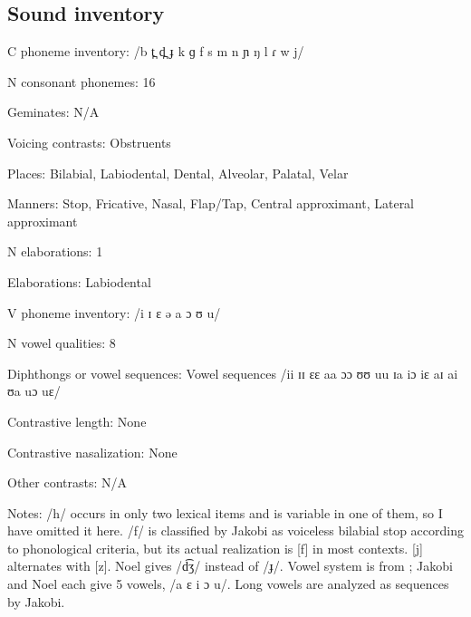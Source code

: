 {\subsection*{Sound inventory}
\begin{appendixdesc}

\item[C phoneme inventory:] /b t̪ d̪ ɟ k ɡ f s m n ɲ ŋ l ɾ w j/

\item[N consonant phonemes:] 16

\item[Geminates:] N/A

\item[Voicing contrasts:] Obstruents

\item[Places:] Bilabial, Labiodental, Dental, Alveolar, Palatal, Velar

\item[Manners:] Stop, Fricative, Nasal, Flap/Tap, Central approximant, Lateral approximant

\item[N elaborations:] 1

\item[Elaborations:] Labiodental

\item[V phoneme inventory:] /i ɪ ɛ ə a ɔ ʊ u/

\item[N vowel qualities:] 8

\item[Diphthongs or vowel sequences:] Vowel sequences /ii ɪɪ ɛɛ aa ɔɔ ʊʊ uu ɪa iɔ iɛ aɪ ai ʊa uɔ uɛ/

\item[Contrastive length:] None

\item[Contrastive nasalization:] None

\item[Other contrasts:] N/A

\item[Notes:] /h/ occurs in only two lexical items and is variable in one of them, so I have omitted it here. /f/ is classified by Jakobi as voiceless bilabial stop according to phonological criteria, but its actual realization is [f] in most contexts. [j] alternates with [z]. Noel gives /d͡ʒ/ instead of /ɟ/. Vowel system is from  \citet{KutschLojengaWaag2004}; Jakobi and Noel each give 5 vowels, /a ɛ i ɔ u/. Long vowels are analyzed as sequences by Jakobi.
\end{appendixdesc}
}
